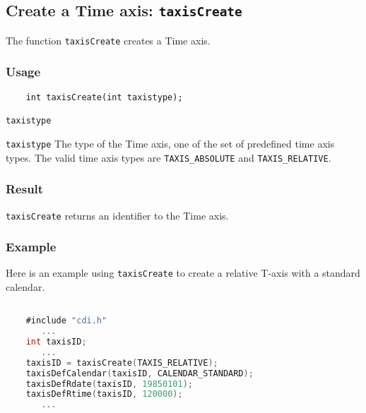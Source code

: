 

\subsection{Create a Time axis: \texttt{taxisCreate}}
\label{taxisCreate}

The function {\texttt{taxisCreate}} creates a Time axis.

\subsubsection*{Usage}

\begin{verbatim}
    int taxisCreate(int taxistype);
\end{verbatim}

\hspace*{4mm}\begin{minipage}[]{15cm}
\begin{deflist}{\texttt{taxistype}\ }
\item[\texttt{taxistype}]
The type of the Time axis, one of the set of predefined {\CDI} time axis types.
                      The valid {\CDI} time axis types are {\texttt{TAXIS\_ABSOLUTE}} and {\texttt{TAXIS\_RELATIVE}}.

\end{deflist}
\end{minipage}

\subsubsection*{Result}

{\texttt{taxisCreate}} returns an identifier to the Time axis.


\subsubsection*{Example}

Here is an example using {\texttt{taxisCreate}} to create a relative T-axis with a standard calendar.

\begin{lstlisting}[language=C, backgroundcolor=\color{pyellow}, basicstyle=\small, columns=flexible]

    #include "cdi.h"
       ...
    int taxisID;
       ...
    taxisID = taxisCreate(TAXIS_RELATIVE);
    taxisDefCalendar(taxisID, CALENDAR_STANDARD);
    taxisDefRdate(taxisID, 19850101);
    taxisDefRtime(taxisID, 120000);
       ...
\end{lstlisting}


